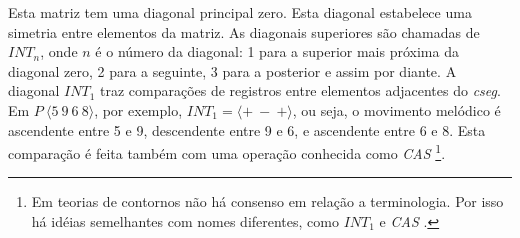\documentclass[brazil]{article}
\newcommand{\termo}[1]{\textit{#1}}
\begin{document}
\begin{table}
  \centering
  \caption{Exemplos de \termo{COM-matrix}}
  \label{tab:matriz-exemplos}
\end{table}

Esta matriz tem uma diagonal principal zero. Esta diagonal estabelece
uma simetria entre elementos da matriz. As diagonais superiores são
chamadas de $INT_n$, onde $n$ é o número da diagonal: 1 para a
superior mais próxima da diagonal zero, 2 para a seguinte, 3 para a
posterior e assim por diante. A diagonal $INT_1$ traz comparações de
registros entre elementos adjacentes do \termo{cseg}. Em
$P\:\langle5\:9\:6\:8\rangle$, por exemplo,
$INT_1=\langle+\:-\:+\rangle$, ou seja, o movimento melódico é
ascendente entre 5 e 9, descendente entre 9 e 6, e ascendente entre 6
e 8. Esta comparação é feita também com uma operação conhecida como
\termo{CAS} \footnote{Em teorias de contornos não há consenso em
  relação a terminologia. Por isso há idéias semelhantes com nomes
  diferentes, como $INT_1$ e \termo{CAS}
  \cite{friedmann87:response}.}.
\end{document}
